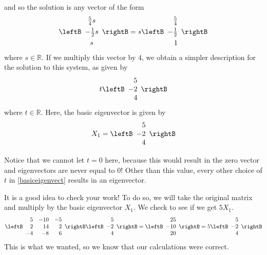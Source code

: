 \begin{solution}
and so the solution is any vector of the form
\begin{equation*}
\leftB
\begin{array}{c}
\vspace{0.05in}\frac{5}{4}s \\
-\vspace{0.05in}\frac{1}{2}s \\
s
\end{array}
\rightB =s\leftB
\begin{array}{r}
\vspace{0.05in}\frac{5}{4} \\
-\vspace{0.05in}\frac{1}{2} \\
1
\end{array}
\rightB
\end{equation*}
where $s\in \mathbb{R}$. If we multiply this vector by $4$, we obtain
a simpler description for the solution to this system, as given by
\begin{equation}
 t \leftB
\begin{array}{r}
 5 \\
-2 \\
 4
\end{array}
\rightB  \label{basiceigenvect}
\end{equation}
where $t\in \mathbb{R}$. Here, the basic eigenvector is given by 
\begin{equation*}
X_1 = 
\leftB
\begin{array}{r}
5 \\
-2 \\
4
\end{array}
\rightB
\end{equation*}

Notice that we cannot let $t=0$ here, because this would result in the zero vector and
eigenvectors are never equal to 0!
Other than this value, every other choice of $t$ in \ref{basiceigenvect} results in
an eigenvector.

It is a good idea to check your work! To do so, we will
take the original matrix and multiply by the basic eigenvector $X_1$. We check 
to see if we get $5X_1$.
\begin{equation*}
\leftB
\begin{array}{rrr}
5 & -10 & -5 \\
2 & 14 & 2 \\
-4 & -8 & 6
\end{array}
\rightB \leftB
\begin{array}{r}
 5 \\
-2 \\
 4
\end{array}
\rightB = \leftB
\begin{array}{r}
 25 \\
-10 \\
 20
\end{array}
\rightB =5\leftB
\begin{array}{r}
 5 \\
-2 \\
 4
\end{array}
\rightB
\end{equation*}
This is what we wanted, so we know that our calculations were correct.


\end{solution}
